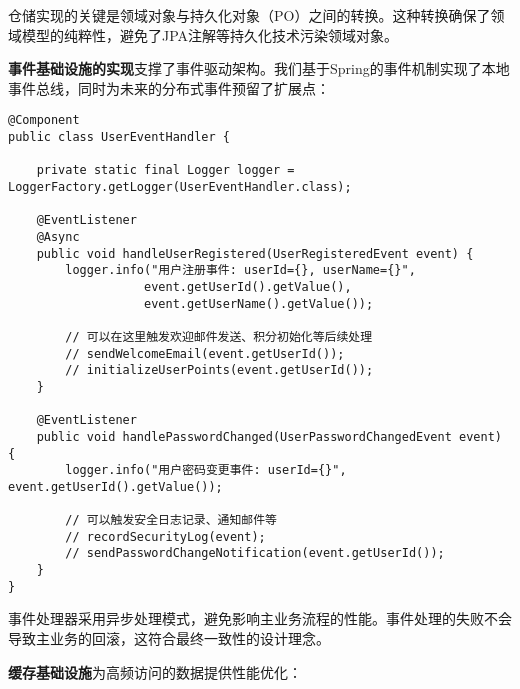 \documentclass[a4paper,12pt]{article}
\begin{document}
仓储实现的关键是领域对象与持久化对象（PO）之间的转换。这种转换确保了领域模型的纯粹性，避免了JPA注解等持久化技术污染领域对象。

\textbf{事件基础设施的实现}支撑了事件驱动架构。我们基于Spring的事件机制实现了本地事件总线，同时为未来的分布式事件预留了扩展点：

\begin{lstlisting}[caption=领域事件处理器示例]
@Component
public class UserEventHandler {
    
    private static final Logger logger = LoggerFactory.getLogger(UserEventHandler.class);
    
    @EventListener
    @Async
    public void handleUserRegistered(UserRegisteredEvent event) {
        logger.info("用户注册事件: userId={}, userName={}", 
                   event.getUserId().getValue(), 
                   event.getUserName().getValue());
        
        // 可以在这里触发欢迎邮件发送、积分初始化等后续处理
        // sendWelcomeEmail(event.getUserId());
        // initializeUserPoints(event.getUserId());
    }
    
    @EventListener
    public void handlePasswordChanged(UserPasswordChangedEvent event) {
        logger.info("用户密码变更事件: userId={}", event.getUserId().getValue());
        
        // 可以触发安全日志记录、通知邮件等
        // recordSecurityLog(event);
        // sendPasswordChangeNotification(event.getUserId());
    }
}
\end{lstlisting}

事件处理器采用异步处理模式，避免影响主业务流程的性能。事件处理的失败不会导致主业务的回滚，这符合最终一致性的设计理念。

\textbf{缓存基础设施}为高频访问的数据提供性能优化：
\end{document}
